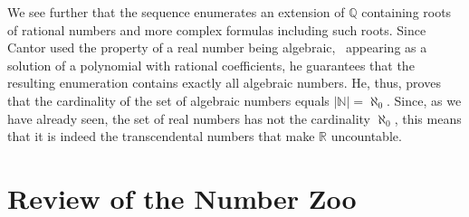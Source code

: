 \documentclass[tikz]{scrreprt}
\begin{document}
We see further that the sequence enumerates an extension
of $\mathbb{Q}$ containing roots of rational numbers and 
more complex formulas including such roots.
Since Cantor used the property of a real number
being algebraic, \ie\ appearing as a solution
of a polynomial with rational coefficients,
he guarantees that the resulting enumeration
contains exactly all algebraic numbers.
He, thus, proves that the cardinality of the set
of algebraic numbers equals $|\mathbb{N}| = \aleph_0$.
Since, as we have already seen,
the set of real numbers has not the cardinality $\aleph_0$,
this means that it is indeed the transcendental numbers
that make $\mathbb{R}$ uncountable.

\section{Review of the Number Zoo}
\end{document}
